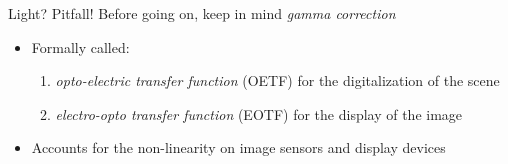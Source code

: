 \documentclass[aspectratio=169,handout,usepdftitle=false]{fireshonks}
\begin{document}
\begin{frame}{Light? Pitfall!}
    Before going on, keep in mind \emph{gamma correction} \autocite{tooms}
    \begin{itemize}
        \item Formally called:
        \begin{enumerate}
            \item \emph{opto-electric transfer function} (OETF) for the digitalization of the scene
            \item \emph{electro-opto transfer function} (EOTF) for the display of the image
        \end{enumerate}
        \item Accounts for the non-linearity on image sensors and display devices
    \end{itemize}
\end{frame}
\end{document}

